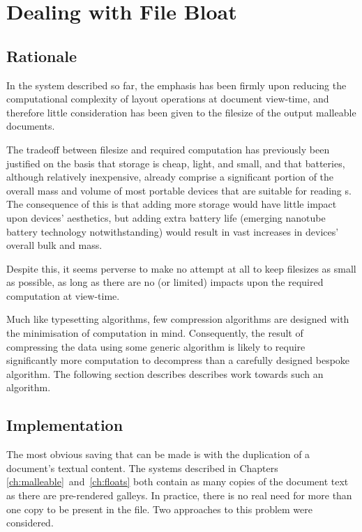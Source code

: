 \chapter{Dealing with File Bloat}\label{ch:bloat}

\section{Rationale}
In the system described so far, the emphasis has been firmly upon reducing the computational complexity of layout operations at document view-time, and therefore little consideration has been given to the filesize of the output malleable documents.


The tradeoff between filesize and required computation has previously been justified on the basis that storage is cheap, light, and small, and that batteries, although relatively inexpensive, already comprise a significant portion of the overall mass and volume of most portable devices that are suitable for reading \ebook{}s. The consequence of this is that adding more storage would have little impact upon devices' aesthetics, but adding extra battery life (emerging nanotube battery technology notwithstanding) would result in vast increases in devices' overall bulk and mass.

Despite this, it seems perverse to make no attempt at all to keep filesizes as small as possible, as long as there are no (or limited) impacts upon the required computation at view-time.

Much like typesetting algorithms, few compression algorithms are designed with the minimisation of computation in mind. Consequently, the result of compressing the data using some generic algorithm is likely to require significantly more computation to decompress than a carefully designed bespoke algorithm. The following section describes describes work towards such an algorithm.


\section{Implementation}
The most obvious saving that can be made is with the duplication of a document's textual content. The systems described in Chapters \ref{ch:malleable}~and~\ref{ch:floats} both contain as many copies of the document text as there are pre-rendered galleys. In practice, there is no real need for more than one copy to be present in the file. Two approaches to this problem were considered.

